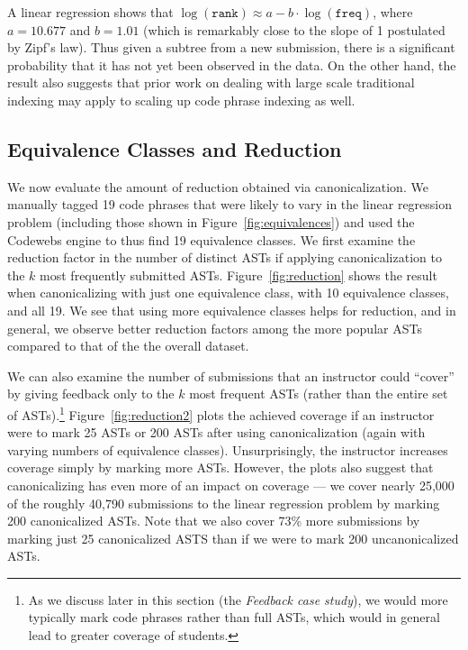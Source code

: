 A linear regression shows that $\log (\texttt{rank}) \approx a- b\cdot\log (\texttt{freq})$, where $a=10.677$
and $b=1.01$ (which is remarkably close to the slope of 1 postulated by Zipf's law). 
Thus given a subtree from a new submission, there is a significant probability that it has not yet 
been observed in the data.  On the other hand, the result also suggests that prior work on dealing with large scale traditional indexing may apply to
scaling up code phrase indexing as well.

\subsection{Equivalence Classes and Reduction}
We now evaluate the amount of reduction obtained via canonicalization.  We 
manually tagged 19 code phrases that were likely to vary in the linear regression problem (including those shown in Figure~\ref{fig:equivalences})
and used the Codewebs engine to thus find 19 equivalence classes.
We first examine the reduction factor in the number of distinct ASTs
if applying canonicalization to the $k$ most frequently submitted ASTs.
Figure~\ref{fig:reduction} shows the result when canonicalizing with just one equivalence
class, with 10 equivalence classes, and all 19.  We see that using more equivalence classes
helps for reduction, and in general, we observe better reduction factors among the more popular
ASTs compared to that of the the overall dataset.

We can also examine the number of submissions that an instructor could ``cover'' by giving feedback only to
the $k$ most frequent ASTs (rather than the entire set of ASTs).\footnote{
As we discuss later in this section (the \emph{Feedback case study}), we would more typically  mark code phrases rather than full ASTs,
which would in general lead to greater coverage of students.}
Figure~\ref{fig:reduction2} plots the achieved coverage if an instructor were to mark 25 ASTs or 200 ASTs
after using canonicalization (again with varying numbers of equivalence classes).
Unsurprisingly, the instructor increases coverage simply by marking more ASTs.  However,
the plots also suggest that canonicalizing has even more of an impact on coverage --- we cover nearly 25,000
of the roughly 40,790 submissions to the linear regression problem by marking 200 canonicalized ASTs.
Note that we also cover 73\% more submissions by marking just 25 canonicalized ASTS than 
if we were to mark 200 uncanonicalized ASTs.

